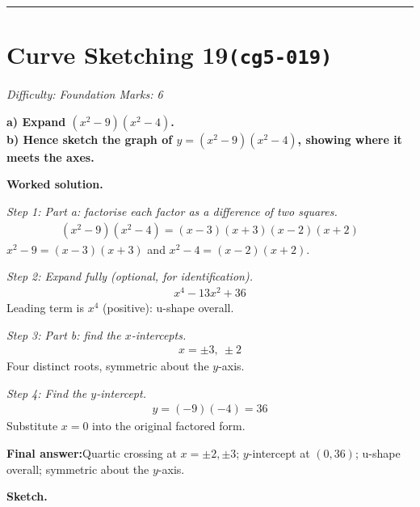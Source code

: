 \documentclass[11pt]{article}
\newcommand{\question}[1]{\par\medskip\noindent\textbf{#1}\par}
\begin{document}
\medskip\hrule

\section*{Curve Sketching 19\quad\small\texttt{(cg5-019)}}
\textit{Difficulty: Foundation \quad\textbar\quad Marks: 6}

\question{a) Expand \( (x^2 - 9)(x^2 - 4) \). \\[3pt] b) Hence sketch the graph of \( y = (x^2 - 9)(x^2 - 4) \), showing where it meets the axes.}

\textbf{Worked solution.}

\textit{Step 1: Part a: factorise each factor as a difference of two squares.}
\[\begin{gathered}
(x^2-9)(x^2-4) = (x-3)(x+3)(x-2)(x+2)
\end{gathered}\]
\( x^2 - 9 = (x-3)(x+3) \) and \( x^2 - 4 = (x-2)(x+2) \).

\textit{Step 2: Expand fully (optional, for identification).}
\[\begin{gathered}
x^4 - 13x^2 + 36
\end{gathered}\]
Leading term is \( x^4 \) (positive): u-shape overall.

\textit{Step 3: Part b: find the \( x \)-intercepts.}
\[\begin{gathered}
x = \pm 3,\ \pm 2
\end{gathered}\]
Four distinct roots, symmetric about the \( y \)-axis.

\textit{Step 4: Find the \( y \)-intercept.}
\[\begin{gathered}
y = (-9)(-4) = 36
\end{gathered}\]
Substitute \( x = 0 \) into the original factored form.

\begin{answerbox}
\textbf{Final answer:}\quad Quartic crossing at \(\displaystyle x = \pm 2, \pm 3\); \(\displaystyle y\)-intercept at \(\displaystyle (0, 36)\); u-shape overall; symmetric about the \(\displaystyle y\)-axis.
\end{answerbox}
\textbf{Sketch.}
\end{document}
